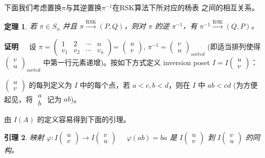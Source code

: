 \documentclass[a4paper,11pt,twoside]{book}
\newtheorem{thm}{定理}[section]
\newtheorem{lem}[thm]{引理}
\def\pf{{\bf 证明~~ }}
\begin{document}
下面我们考虑置换$\pi$与其逆置换$\pi^{-1 }$在RSK算法下所对应的杨表
之间的相互关系。


\begin{thm} 若 $\pi\in S_n$ 并且
$\pi\xrightarrow{\text{RSK}}(P, Q)$，则对 $\pi$ 的逆 $\pi^{-1 }$，有
$\pi^{-1 }\xrightarrow{\text{RSK}}(Q, P)$。
\end{thm}

\pf 设 $\pi=\left(\begin{array}{cccc}
1&2&\cdots&n\\v_1&v_2&\cdots&v_n\end{array}\right)$=
$\left(\begin{array}{c}
u\\v\end{array}\right)$, $\pi^{-1 }=\left(\begin{array}{c}
v\\u\end{array}\right)_{sorted}$ (即适当排列使得
$\left(\begin{array}{c} v\\u\end{array}\right)_{sorted}$
中第一行元素递增)。按如下方式定义 inversion poset
$I=I\left(\begin{array}{c} u\\v\end{array}\right)$：

$\left(\begin{array}{c} u\\v\end{array}\right)$ 的每列定义为 $I$
中的每个点，若 $a<c, b<d$，则在 $I$ 中 $ab<cd$ (为方便起见，将
$\begin{array}{c} a\\b\end{array}$ 记为 $ab$)。

由 $I(A)$ 的定义容易得到下面的引理。


\begin{lem}  映射 $\varphi: I\left(\begin{array}{c}
u\\v\end{array}\right)\rightarrow I\left(\begin{array}{c}
v\\u\end{array}\right)$ \ \ $\varphi(ab)=ba$ 是
$I\left(\begin{array}{c} u\\v\end{array}\right)$ 到
$I\left(\begin{array}{c} v\\u\end{array}\right)$ 的同构。\end{lem}
\end{document}
